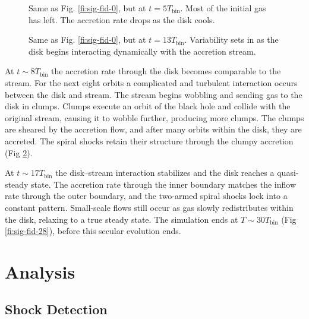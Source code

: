 \documentclass{emulateapj}
\begin{document}
\begin{figure}
\caption{\label{fi:sig-fid-5} Same as Fig. \ref{fi:sig-fid-0}, but at $t = 5 T_\text{bin}$.  Most of the initial gas has left. The accretion rate drops as the disk cools.}
\end{figure}

\begin{figure}
\caption{\label{fi:sig-fid-13} Same as Fig. \ref{fi:sig-fid-0}, but at $t = 13 T_\text{bin}$.  Variability sets in as the disk begins interacting dynamically with the accretion stream.}
\end{figure}


At $t\sim 8 T_\text{bin}$ the accretion rate through the disk becomes comparable to the stream.  For the next eight orbits a complicated and turbulent interaction occurs between the disk and stream.  The stream begins wobbling and sending gas to the disk in clumps.  Clumps execute an orbit of the black hole and collide with the original stream, causing it to wobble further, producing more clumps.  The clumps are sheared by the accretion flow, and after many orbits within the disk, they are accreted. The spiral shocks retain their structure through the clumpy accretion (Fig \ref{fi:sig-fid-13}).

At $t\sim17 T_\text{bin}$ the disk--stream interaction stabilizes and the disk reaches a quasi-steady state.  The accretion rate through the inner boundary matches the inflow rate through the outer boundary, and the two-armed spiral shocks lock into a constant pattern.  Small-scale flows still occur as gas slowly redistributes within the disk, relaxing to a true steady state.  The simulation ends at $T\sim30 T_\text{bin}$ (Fig \ref{fi:sig-fid-28}), before this secular evolution ends.

\begin{figure*}
\caption{\label{fi:sig-fid-28} As Fig. \ref{fi:sig-fid-0}, but at $t = 28 T_\text{bin}$.  The disk in a quasi-steady state.}
\end{figure*}



\section{Analysis}
\label{sec:analysis}


\subsection{Shock Detection}
\label{subsec:shockDet}
\end{document}
